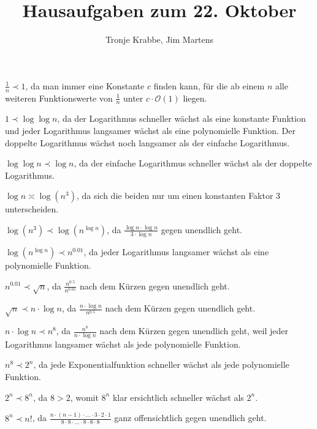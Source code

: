 \documentclass[10pt,a4paper,oneside,ngerman,numbers=noenddot]{scrartcl}
\begin{document}
\author{Tronje Krabbe, Jim Martens}
\title{Hausaufgaben zum 22. Oktober}
\maketitle
\section{} %
	\subsection{} %
	$\frac{1}{n} \prec 1$, da man immer eine Konstante $c$ finden kann, für die ab einem $n$ alle weiteren Funktionswerte von $\frac{1}{n}$ unter $c \cdot \mathcal{O}(1)$ liegen.
	
	$1 \prec \log\log n$, da der Logarithmus schneller wächst als eine konstante Funktion und jeder Logarithmus langsamer wächst als eine polynomielle Funktion. Der doppelte Logarithmus wächst noch langsamer als der einfache Logarithmus.
	
	$\log\log n \prec \log n$, da der einfache Logarithmus schneller wächst als der doppelte Logarithmus.
	
	$\log n \asymp \log(n^{3})$, da sich die beiden nur um einen konstanten Faktor $3$ unterscheiden.
	
	$\log(n^{3}) \prec \log(n^{\log n})$, da $\frac{\log n \cdot \log n}{3 \cdot \log n}$ gegen unendlich geht.
	
	$\log(n^{\log n}) \prec n^{0.01}$, da jeder Logarithmus langsamer wächst als eine polynomielle Funktion.
	
	$n^{0.01} \prec \sqrt{n}$, da $\frac{n^{0.5}}{n^{0.01}}$ nach dem Kürzen gegen unendlich geht.
	
	$\sqrt{n} \prec n \cdot \log n$, da $\frac{n \cdot \log n}{n^{0.5}}$ nach dem Kürzen gegen unendlich geht.
	
	$n \cdot \log n \prec n^{8}$, da $\frac{n^{8}}{n \cdot \log n}$ nach dem Kürzen gegen unendlich geht, weil jeder Logarithmus langsamer wächst als jede polynomielle Funktion.
	
	$n^{8} \prec 2^{n}$, da jede Exponentialfunktion schneller wächst als jede polynomielle Funktion.
	
	$2^{n} \prec 8^{n}$, da $8 > 2$, womit $8^{n}$ klar ersichtlich schneller wächst als $2^{n}$.
	
	$8^{n} \prec n!$, da $\frac{n \cdot (n-1) \cdot ... \cdot 3 \cdot 2 \cdot 1}{8 \cdot 8 \cdot ... \cdot 8 \cdot 8 \cdot 8}$ ganz offensichtlich gegen unendlich geht.
	
\end{document}
